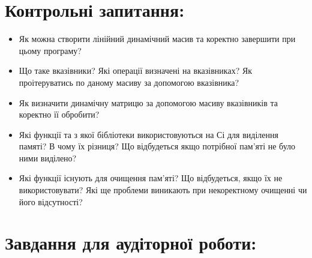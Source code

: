 \documentclass[a5paper,titlepage,openany,twoside,draft]{book_unv}%
\begin{document}
\section{Контрольні запитання:}
\begin{itemize}
\item
  Як можна створити лінійний динамічний масив та коректно завершити при
  цьому програму?
\item
  Що таке вказівники? Які операції визначені на вказівниках? Як
  проітеруватись по даному масиву за допомогою вказівника?
\item
  Як визначити динамічну матрицю за допомогою масиву вказівників та
  коректно її обробити?
\item
  Які функції та з якої бібліотеки використовуються на Сі для виділення
  памяті? В чому їх різниця? Що відбудеться якщо потрібної пам'яті не
  було ними виділено?
\item
  Які функції існують для очищення пам'яті? Що відбудеться, якщо їх не
  використовувати? Які ще проблеми виникають при некоректному очищенні
  чи його відсутності?
\end{itemize}

\section{Завдання для аудіторної роботи:}
\end{document}
